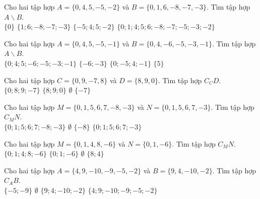 \begin{ex}
 Cho hai tập hợp $A=\{{0, 4, 5, -5, -2}\}$ và $B=\{{0, 1, 6, -8, -7, -3}\}$. Tìm tập hợp $A\backslash B$. \\ 
\choice
{ $\{{0}\}$ }
   { $\{{1; 6; -8; -7; -3}\}$ }
     { \True $\{{-5; 4; 5; -2}\}$ }
    { $\{{0; 1; 4; 5; 6; -8; -7; -5; -3; -2}\}$ }
\loigiai{ 
  
 }\end{ex}

\begin{ex}
 Cho hai tập hợp $A=\{{0, 4, 5, -5, -1}\}$ và $B=\{{0, 4, -6, -5, -3, -1}\}$. Tìm tập hợp $A\backslash B$. \\ 
\choice
{ $\{{0; 4; 5; -6; -5; -3; -1}\}$ }
   { $\{{-6; -3}\}$ }
     { $\{{0; -5; 4; -1}\}$ }
    { \True $\{{5}\}$ }
\loigiai{ 
  
 }\end{ex}

\begin{ex}
 Cho hai tập hợp $C=\{{0, 9, -7, 8}\}$ và $D=\{{8, 9, 0}\}$. Tìm tập hợp $C_C D$.\\ 
\choice
{ $\{{0; 8; 9; -7}\}$ }
   { $\{{8; 9; 0}\}$ }
     { $\emptyset$ }
    { \True $\{{-7}\}$ }
\end{ex}

\begin{ex}
 Cho hai tập hợp $M=\{{0, 1, 5, 6, 7, -8, -3}\}$ và $N=\{{0, 1, 5, 6, 7, -3}\}$. Tìm tập hợp $C_M N$.\\ 
\choice
{ $\{{0; 1; 5; 6; 7; -8; -3}\}$ }
   { $\emptyset$ }
     { \True $\{{-8}\}$ }
    { $\{{0; 1; 5; 6; 7; -3}\}$ }
\end{ex}

\begin{ex}
 Cho hai tập hợp $M=\{{0, 1, 4, 8, -6}\}$ và $N=\{{0, 1, -6}\}$. Tìm tập hợp $C_M N$.\\ 
\choice
{ $\{{0; 1; 4; 8; -6}\}$ }
   { $\{{0; 1; -6}\}$ }
     { $\emptyset$ }
    { \True $\{{8; 4}\}$ }
\end{ex}

\begin{ex}
 Cho hai tập hợp $A=\{{4, 9, -10, -9, -5, -2}\}$ và $B=\{{9, 4, -10, -2}\}$. Tìm tập hợp $C_A B$.\\ 
\choice
{ \True $\{{-5; -9}\}$ }
   { $\emptyset$ }
     { $\{{9; 4; -10; -2}\}$ }
    { $\{{4; 9; -10; -9; -5; -2}\}$ }
\end{ex}


